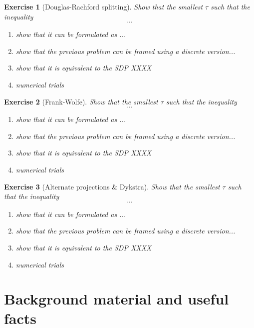 \documentclass[11pt,a4paper]{article}
\newtheorem{exercise}{Exercise}
\begin{document}
	
	\begin{exercise}[Douglas-Rachford splitting]
	Show that the smallest $\tau$ such that the inequality
	\[ ... \]
	\begin{enumerate}
	\item show that it can be formulated as ...
	\item show that the previous problem can be framed using a discrete version...
	\item show that it is equivalent to the SDP XXXX
	\item numerical trials
	\end{enumerate}
	\end{exercise}


	\begin{exercise}[Frank-Wolfe]
	Show that the smallest $\tau$ such that the inequality
	\[ ... \]
	\begin{enumerate}
	\item show that it can be formulated as ...
	\item show that the previous problem can be framed using a discrete version...
	\item show that it is equivalent to the SDP XXXX
	\item numerical trials
	\end{enumerate}
	\end{exercise}	
	

	\begin{exercise}[Alternate projections \& Dykstra]
	Show that the smallest $\tau$ such that the inequality
	\[ ... \]
	\begin{enumerate}
	\item show that it can be formulated as ...
	\item show that the previous problem can be framed using a discrete version...
	\item show that it is equivalent to the SDP XXXX
	\item numerical trials
	\end{enumerate}
	\end{exercise}	
	
	
	\section{Background material and useful facts}			%
	\label{sec:background}
\end{document}
